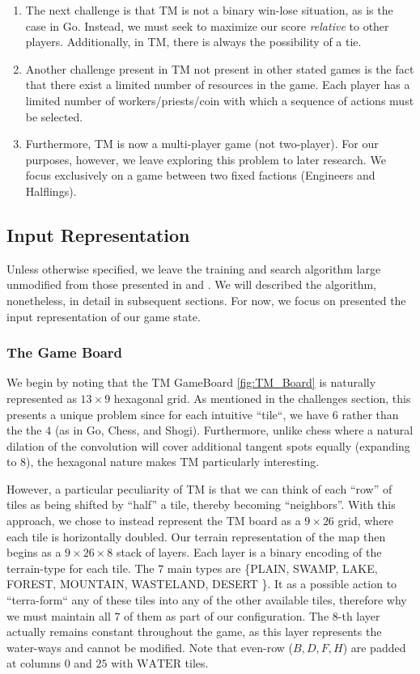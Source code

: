 \documentclass[8pt,twocolumn]{article}
\begin{document}
\begin{enumerate}
\begin{enumerate}
    \end{enumerate}
    \item The next challenge is that TM is not a binary win-lose situation, as is the case in Go. Instead, we must seek to maximize our score \textit{relative} to other players. Additionally, in TM, there is always the possibility of a tie. 
    \item Another challenge present in TM not present in other stated games is the fact that there exist a limited number of resources in the game. Each player has a limited number of workers/priests/coin with which a sequence of actions must be selected.
    \item Furthermore, TM is now a multi-player game (not two-player). For our purposes, however, we leave exploring this problem to later research. We focus exclusively on a game between two fixed factions (Engineers and Halflings).
\end{enumerate}

\subsection{Input Representation}
\label{subsection:input_representation}
Unless otherwise specified, we leave the training and search algorithm large unmodified from those presented in \cite{AlphaZero} and \cite{AlphaGoZero}. We will described the algorithm, nonetheless, in detail in subsequent sections. For now, we focus on presented the input representation of our game state.

\subsubsection{The Game Board}
\label{subsubsection:the_game_board}

We begin by noting that the TM GameBoard \ref{fig:TM_Board} is naturally represented as $13 \times 9$ hexagonal grid. As mentioned in the challenges section, this presents a unique problem since for each intuitive ``tile``, we have $6$ rather than the the $4$ (as in Go, Chess, and Shogi). Furthermore, unlike chess where a natural dilation of the convolution will cover additional tangent spots equally (expanding to $8$), the hexagonal nature makes TM particularly interesting.

However, a particular peculiarity of TM is that we can think of each ``row'' of tiles as being shifted by ``half'' a tile, thereby becoming ``neighbors''. With this approach, we chose to instead represent the TM board as a $9 \times 26$ grid, where each tile is horizontally doubled. Our terrain representation of the map then begins as a $9 \times 26 \times 8$ stack of layers. Each layer is a binary encoding of the terrain-type for each tile. The $7$ main types are \{PLAIN, SWAMP, LAKE, FOREST, MOUNTAIN, WASTELAND, DESERT \}. It as a possible action to ``terra-form`` any of these tiles into any of the other available tiles, therefore why we must maintain all $7$ of them as part of our configuration. The $8$-th layer actually remains constant throughout the game, as this layer represents the water-ways and cannot be modified. Note that even-row ($B, D, F, H$) are padded at columns $0$ and $25$ with $\text{WATER}$ tiles.
\end{document}
